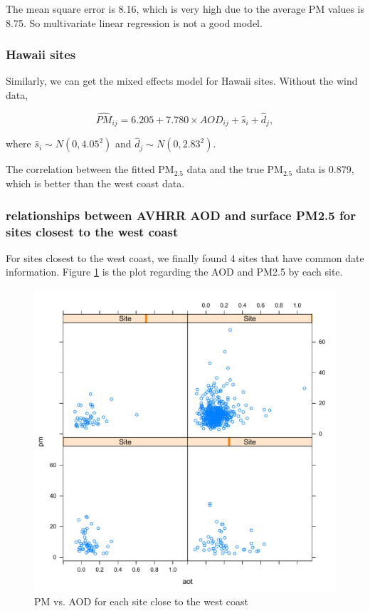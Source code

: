 \documentclass[10pt]{article}
\begin{document}
The mean square error is 8.16, which is very high due to the average PM values is 8.75. So multivariate linear regression is not a good model.

\subsubsection{Hawaii sites}
Similarly, we can get the mixed effects model for Hawaii sites.
Without the wind data,

$$\hat{PM}_{ij} = 6.205 + 7.780\times AOD_{ij} + \hat{s}_i + \hat{d}_j, $$

where $\hat{s}_i\sim N(0, 4.05^2)$ and $\hat{d}_j\sim N(0, 2.83^2)$. 

The correlation between the fitted PM$_{2.5}$ data and the true PM$_{2.5}$ data is 0.879, which is better than the west coast data. 





\subsubsection{relationships between AVHRR AOD and surface PM2.5 for sites closest to the west coast}

For sites closest to the west coast, we finally found 4 sites that have common date information. Figure \ref{fig3.3} is the plot regarding the AOD and PM2.5 by each site. 

\begin{figure}[!h]
\centering
\includegraphics[width=\linewidth]{3.pdf}
\caption{PM vs. AOD for each site close to the west coast}
\label{fig3.3}
\end{figure}
\end{document}
